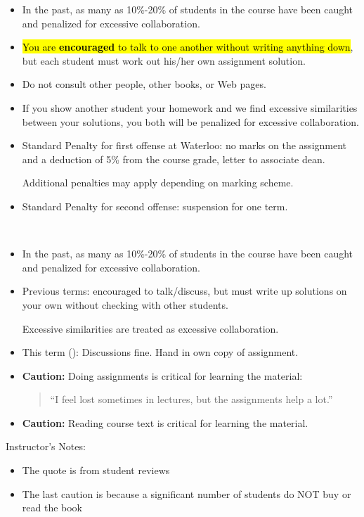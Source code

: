 \begin{frame}[fragile]
\begin{itemize}
\item In the past, as many as 10\%-20\% of students in the course have been 
	caught and penalized for excessive collaboration.
\item \hl{You are \textbf{encouraged} to talk to one another without writing anything down},
	 but each student must work out his/her own assignment solution.
\item Do not consult other people, other books, or Web pages.
\item If you show another student your homework and we find excessive
	similarities between your solutions, you both will be penalized
	for excessive collaboration.
\item Standard Penalty for first offense at Waterloo: 
	no marks on the assignment and a deduction of 5\% from the course 
grade, letter to associate dean.

	Additional penalties may apply depending on marking scheme.
\item Standard Penalty for second offense: suspension for one term.
\end{itemize}
\BNotes\ifnum{}
~
\fi\ENotes
\end{frame}
\begin{frame}[fragile]
\begin{itemize}
\item In the past, as many as 10\%-20\% of students in the course have been 
	caught and penalized for excessive collaboration.

\item Previous terms: encouraged to talk/discuss, but must write up
	solutions on your own without checking with other students.

	Excessive similarities are treated as excessive collaboration.
\bigskip
\item This term (\ShortTerm): Discussions fine. Hand in own copy of assignment.

\item {\bf Caution:}
	Doing assignments is critical for learning the material:

	\begin{quote}
	``I feel lost sometimes in lectures, but the assignments help a lot.''
	\end{quote}
\item {\bf Caution:}
	Reading course text is critical for learning the material.

\end{itemize}
\BNotes\ifnum{}
Instructor's Notes:
\begin{itemize}
\item The quote is from student reviews
\item The last caution is because a significant number of students do NOT
	buy or read the book
\end{itemize}
\fi\ENotes
\end{frame}

